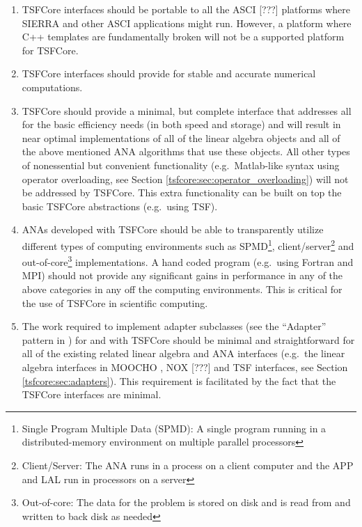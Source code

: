 \documentclass[10pt,fleqn]{article}
\begin{document}
\begin{enumerate}

\item
TSFCore interfaces should be portable to all the ASCI [???]
platforms where SIERRA
\cite{ref:SIERRA} and other ASCI applications might run.  However, a
platform where C++ templates are fundamentally broken will not be a
supported platform for TSFCore.

\item
TSFCore interfaces should provide for stable and accurate numerical
computations.

\item
TSFCore should provide a minimal, but complete interface that
addresses all for the basic efficiency needs (in both speed and
storage) and will result in near optimal implementations of all of the
linear algebra objects and all of the above mentioned ANA algorithms
that use these objects.  All other types of nonessential but
convenient functionality (e.g.~Matlab-like syntax using operator
overloading, see Section \ref{tsfcore:sec:operator_overloading}) will
not be addressed by TSFCore.  This extra functionality can be built on
top the basic TSFCore abstractions (e.g.~using TSF).

\item
ANAs developed with TSFCore should be able to transparently utilize
different types of computing environments such as SPMD\footnote{Single
Program Multiple Data (SPMD): A single program running in a
distributed-memory environment on multiple parallel processors},
client/server\footnote{Client/Server: The ANA runs in a process on a
client computer and the APP and LAL run in processors on a server} and
out-of-core\footnote{Out-of-core: The data for the problem is stored
on disk and is read from and written to back disk as needed}
implementations.  A hand coded program (e.g.~using Fortran and MPI)
should not provide any significant gains in performance in any of the
above categories in any off the computing environments.  This is
critical for the use of TSFCore in scientific computing.

\item
The work required to implement adapter subclasses (see the ``Adapter''
pattern in \cite{ref:gama_et_al_1995}) for and with TSFCore should be
minimal and straightforward for all of the existing related linear
algebra and ANA interfaces (e.g.~the linear algebra interfaces in
MOOCHO \cite{ref:moochouserguide}, NOX [???] and TSF interfaces, see
Section \ref{tsfcore:sec:adapters}).  This requirement is facilitated
by the fact that the TSFCore interfaces are minimal.

\end{enumerate}
\end{document}
